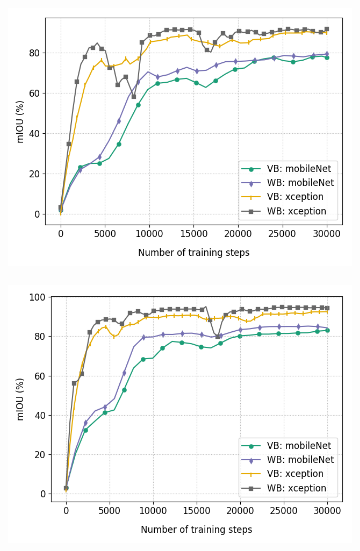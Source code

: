 	\begin{figure}
		\begin{subfigure}{.5\textwidth}
			\centering
			\includegraphics[width=1\linewidth]{images/mobxcep_full}
			\label{backbonesa}
			\caption{}
		\end{subfigure}
		\begin{subfigure}{.5\textwidth}
			\centering
			\includegraphics[width=1\linewidth]{images/mobxcep_size}
			\label{backbonesb}
			\caption{}
		\end{subfigure}
		\begin{subfigure}{.5\textwidth}
			\centering

\end{subfigure}
\end{figure}
